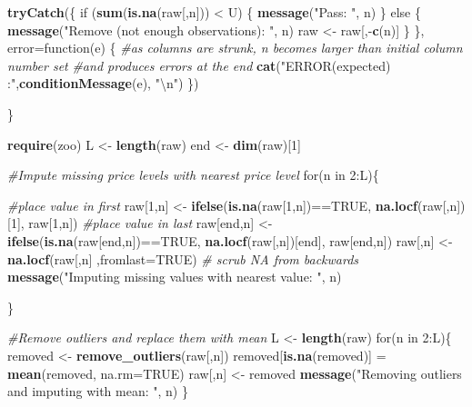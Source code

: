 \documentclass[]{elsarticle} %
\newenvironment{Shaded}{\begin{snugshade}}{\end{snugshade}}
\newcommand{\KeywordTok}[1]{\textcolor[rgb]{0.13,0.29,0.53}{\textbf{{#1}}}}
\newcommand{\DataTypeTok}[1]{\textcolor[rgb]{0.13,0.29,0.53}{{#1}}}
\newcommand{\DecValTok}[1]{\textcolor[rgb]{0.00,0.00,0.81}{{#1}}}
\newcommand{\CharTok}[1]{\textcolor[rgb]{0.31,0.60,0.02}{{#1}}}
\newcommand{\StringTok}[1]{\textcolor[rgb]{0.31,0.60,0.02}{{#1}}}
\newcommand{\CommentTok}[1]{\textcolor[rgb]{0.56,0.35,0.01}{\textit{{#1}}}}
\newcommand{\OtherTok}[1]{\textcolor[rgb]{0.56,0.35,0.01}{{#1}}}
\newcommand{\NormalTok}[1]{{#1}}
\begin{document}
\begin{Shaded}
\begin{Highlighting}[]
  \KeywordTok{tryCatch}\NormalTok{(\{}
        \NormalTok{if (}\KeywordTok{sum}\NormalTok{(}\KeywordTok{is.na}\NormalTok{(raw[,n])) <}\StringTok{ }\NormalTok{U) \{}
                        \KeywordTok{message}\NormalTok{(}\StringTok{"Pass: "}\NormalTok{, n)}
        \NormalTok{\} else \{}
                      \KeywordTok{message}\NormalTok{(}\StringTok{"Remove (not enough observations): "}\NormalTok{, n)}
                        \NormalTok{raw <-}\StringTok{ }\NormalTok{raw[,-}\KeywordTok{c}\NormalTok{(n)]}
        \NormalTok{\}}
    \NormalTok{\}, }\DataTypeTok{error=}\NormalTok{function(e)    \{}
      \CommentTok{#as columns are strunk, n becomes larger than initial column number set }
      \CommentTok{#and produces errors at the end}
    \KeywordTok{cat}\NormalTok{(}\StringTok{"ERROR(expected) :"}\NormalTok{,}\KeywordTok{conditionMessage}\NormalTok{(e), }\StringTok{"}\CharTok{\textbackslash{}n}\StringTok{"}\NormalTok{)}
    \NormalTok{\})}

\NormalTok{\}}

\KeywordTok{require}\NormalTok{(zoo)}
\NormalTok{L <-}\StringTok{ }\KeywordTok{length}\NormalTok{(raw)}
\NormalTok{end <-}\StringTok{ }\KeywordTok{dim}\NormalTok{(raw)[}\DecValTok{1}\NormalTok{]}

\CommentTok{#Impute missing price levels with nearest price level}
\NormalTok{for(n in }\DecValTok{2}\NormalTok{:L)\{}

\CommentTok{#place value in first }
\NormalTok{raw[}\DecValTok{1}\NormalTok{,n] <-}\StringTok{ }\KeywordTok{ifelse}\NormalTok{(}\KeywordTok{is.na}\NormalTok{(raw[}\DecValTok{1}\NormalTok{,n])==}\OtherTok{TRUE}\NormalTok{, }\KeywordTok{na.locf}\NormalTok{(raw[,n])[}\DecValTok{1}\NormalTok{], raw[}\DecValTok{1}\NormalTok{,n]) }
\CommentTok{#place value in last}
\NormalTok{raw[end,n] <-}\StringTok{ }\KeywordTok{ifelse}\NormalTok{(}\KeywordTok{is.na}\NormalTok{(raw[end,n])==}\OtherTok{TRUE}\NormalTok{, }\KeywordTok{na.locf}\NormalTok{(raw[,n])[end], raw[end,n]) }
\NormalTok{raw[,n] <-}\StringTok{ }\KeywordTok{na.locf}\NormalTok{(raw[,n] ,}\DataTypeTok{fromlast=}\OtherTok{TRUE}\NormalTok{) }\CommentTok{# scrub NA from backwards}
\KeywordTok{message}\NormalTok{(}\StringTok{"Imputing missing values with nearest value: "}\NormalTok{, n)}

\NormalTok{\}}

\CommentTok{#Remove outliers and replace them with mean}
\NormalTok{L <-}\StringTok{ }\KeywordTok{length}\NormalTok{(raw)}
\NormalTok{for(n in }\DecValTok{2}\NormalTok{:L)\{}
            \NormalTok{removed <-}\StringTok{ }\KeywordTok{remove_outliers}\NormalTok{(raw[,n])}
            \NormalTok{removed[}\KeywordTok{is.na}\NormalTok{(removed)] =}\StringTok{ }\KeywordTok{mean}\NormalTok{(removed, }\DataTypeTok{na.rm=}\OtherTok{TRUE}\NormalTok{)}
            \NormalTok{raw[,n] <-}\StringTok{ }\NormalTok{removed}
            \KeywordTok{message}\NormalTok{(}\StringTok{"Removing outliers and imputing with mean: "}\NormalTok{, n)}
            \NormalTok{\}}


\end{Highlighting}
\end{Shaded}
\end{document}
